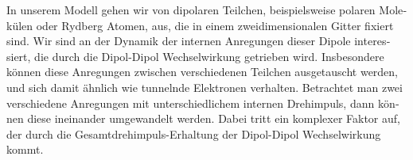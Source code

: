 \begin{otherlanguage}{ngerman}
In unserem Modell gehen wir von dipolaren Teilchen, beispielsweise polaren Molekülen oder Rydberg Atomen, aus, die in einem zweidimensionalen Gitter fixiert sind.
Wir sind an der Dynamik der internen Anregungen dieser Dipole interessiert, die durch die Dipol-Dipol Wechselwirkung getrieben wird.
Insbesondere können diese Anregungen zwischen verschiedenen Teilchen ausgetauscht werden, und sich damit ähnlich wie tunnelnde Elektronen verhalten.
Betrachtet man zwei verschiedene Anregungen mit unterschiedlichem internen Drehimpuls, dann können diese ineinander umgewandelt werden.
Dabei tritt ein komplexer Faktor auf, der durch die Gesamtdrehimpuls-Erhaltung der Dipol-Dipol Wechselwirkung kommt.



\end{otherlanguage}
